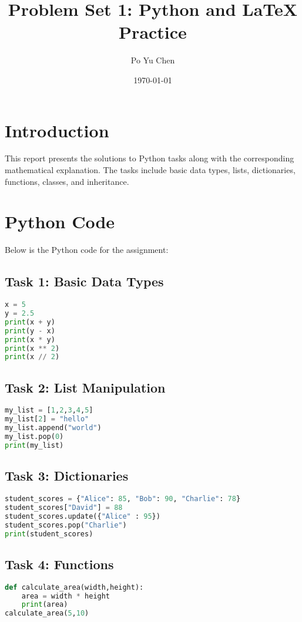 \documentclass{article}
\title{Problem Set 1: Python and LaTeX Practice}
\author{Po Yu Chen}
\date{\today}
\begin{document}
\maketitle

\section{Introduction}
This report presents the solutions to Python tasks along with the corresponding mathematical explanation. The tasks include basic data types, lists, dictionaries, functions, classes, and inheritance.

\section{Python Code}
Below is the Python code for the assignment:

\subsection{Task 1: Basic Data Types}
\begin{lstlisting}[language=Python]
x = 5
y = 2.5
print(x + y)
print(y - x)
print(x * y)
print(x ** 2)
print(x // 2)
\end{lstlisting}

\subsection{Task 2: List Manipulation}
\begin{lstlisting}[language=Python]
my_list = [1,2,3,4,5]
my_list[2] = "hello"
my_list.append("world")
my_list.pop(0)
print(my_list)
\end{lstlisting}

\subsection{Task 3: Dictionaries}
\begin{lstlisting}[language=Python]
student_scores = {"Alice": 85, "Bob": 90, "Charlie": 78}
student_scores["David"] = 88
student_scores.update({"Alice" : 95})
student_scores.pop("Charlie")
print(student_scores)
\end{lstlisting}

\subsection{Task 4: Functions}
\begin{lstlisting}[language=Python]
def calculate_area(width,height):
    area = width * height
    print(area)
calculate_area(5,10)
\end{lstlisting}
\end{document}
